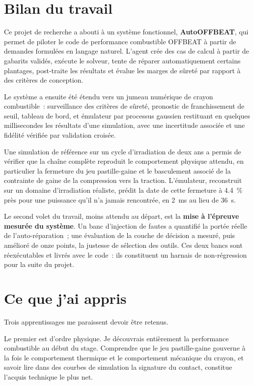 \documentclass[12pt,a4paper,french]{report}
\begin{document}
\section*{Bilan du travail}

Ce projet de recherche a abouti à un système fonctionnel, \textbf{AutoOFFBEAT},
qui permet de piloter le code de performance combustible OFFBEAT à partir de
demandes formulées en langage naturel. L'agent crée des cas de calcul à partir
de gabarits validés, exécute le solveur, tente de réparer automatiquement
certains plantages, post-traite les résultats et évalue les marges de sûreté par
rapport à des critères de conception.

Le système a ensuite été étendu vers un jumeau numérique de crayon
combustible~: surveillance des critères de sûreté, pronostic de franchissement
de seuil, tableau de bord, et émulateur par processus gaussien restituant en
quelques millisecondes les résultats d'une simulation, avec une incertitude
associée et une fidélité vérifiée par validation croisée.

Une simulation de référence sur un cycle d'irradiation de deux ans a permis de
vérifier que la chaîne complète reproduit le comportement physique attendu, en
particulier la fermeture du jeu pastille-gaine et le basculement associé de la
contrainte de gaine de la compression vers la traction. L'émulateur, reconstruit
sur un domaine d'irradiation réaliste, prédit la date de cette fermeture à
\SI{4.4}{\percent} près pour une puissance qu'il n'a jamais rencontrée, en
\SI{2}{\milli\second} au lieu de \SI{36}{\second}.

Le second volet du travail, moins attendu au départ, est la \textbf{mise à
l'épreuve mesurée du système}. Un banc d'injection de fautes a quantifié la
portée réelle de l'auto-réparation~; une évaluation de la couche de décision a
mesuré, puis amélioré de onze points, la justesse de sélection des outils. Ces
deux bancs sont réexécutables et livrés avec le code~: ils constituent un
harnais de non-régression pour la suite du projet.

\section*{Ce que j'ai appris}

Trois apprentissages me paraissent devoir être retenus.

Le premier est d'ordre physique. Je découvrais entièrement la performance
combustible au début du stage. Comprendre que le jeu pastille-gaine gouverne à
la fois le comportement thermique et le comportement mécanique du crayon, et
savoir lire dans des courbes de simulation la signature du contact, constitue
l'acquis technique le plus net.
\end{document}
